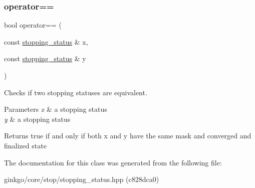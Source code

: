\subsubsection{\texorpdfstring{operator==}{operator==}}
{\footnotesize\ttfamily bool operator== (\begin{DoxyParamCaption}\item[{const \hyperlink{classgko_1_1stopping__status}{stopping\+\_\+status} \&}]{x,  }\item[{const \hyperlink{classgko_1_1stopping__status}{stopping\+\_\+status} \&}]{y }\end{DoxyParamCaption})\hspace{0.3cm}{\ttfamily [friend]}}



Checks if two stopping statuses are equivalent. 


\begin{DoxyParams}{Parameters}
{\em x} & a stopping status \\
\hline
{\em y} & a stopping status\\
\hline
\end{DoxyParams}
\begin{DoxyReturn}{Returns}
true if and only if both {\ttfamily x} and {\ttfamily y} have the same mask and converged and finalized state 
\end{DoxyReturn}


The documentation for this class was generated from the following file\+:\begin{DoxyCompactItemize}
\item 
ginkgo/core/stop/stopping\+\_\+status.\+hpp (c828dca0)\end{DoxyCompactItemize}
